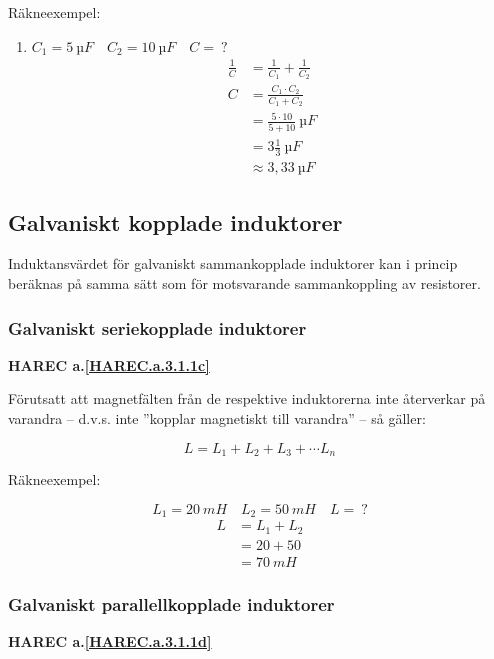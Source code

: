 Räkneexempel:

\begin{enumerate}
  \item \(C_1 = 5\ µF \quad C_2 = 10\ µF \quad C =\ ?\)
    \begin{align*}
      \frac{1}{C} &= \frac{1}{C_1} + \frac{1}{C_2} \\
      C &= \frac{C_1 \cdot C_2}{C_1 + C_2} \\
      &= \frac{5 \cdot 10}{5 + 10}\ µF \\
      &= 3\frac{1}{3}\ µF \\
      &\approx 3,33\ µF
    \end{align*}
\end{enumerate}

\subsection{Galvaniskt kopplade induktorer}

Induktansvärdet för galvaniskt sammankopplade induktorer kan i princip
beräknas på samma sätt som för motsvarande sammankoppling av resistorer.

\subsubsection{Galvaniskt seriekopplade induktorer}
\textbf{HAREC a.\ref{HAREC.a.3.1.1c}\label{myHAREC.a.3.1.1c}}

Förutsatt att magnetfälten från de respektive induktorerna inte återverkar på
varandra -- d.v.s. inte ''kopplar magnetiskt till varandra'' -- så gäller:

\[L = L_1 + L_2 + L_3 + \cdots L_n\]

Räkneexempel:

\[L_1 = 20\ mH \quad L_2 = 50\ mH \quad L =\ ?\]
\begin{align*}
  L &= L_1 + L_2 \\
  & = 20 + 50 \\
  &= 70\ mH
\end{align*}

\subsubsection{Galvaniskt parallellkopplade induktorer}
\textbf{HAREC a.\ref{HAREC.a.3.1.1d}\label{myHAREC.a.3.1.1d}}

